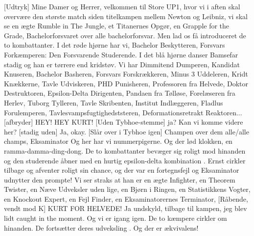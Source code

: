 \documentclass[a4paper,11pt]{article}
\begin{document}
\begin{sketch}
[Udtryk] Mine Damer og Herrer, velkommen til Store UP1, hvor vi i aften skal overvære den største match siden titelkampen mellem Newton og Leibniz, vi skal se en ægte Rumble in The Jungle, et Titanernes Opgør, en Grapple for the Grade, Bachelorforsvaret over alle bachelorforsvar. Men lad os få introduceret de to kombattanter.
I det røde hjørne har vi, Bachelor Beskytteren, Forsvars Forkæmperen: Den Forsvarende Studerende. 
I det blå hjørne danser Bamsefar stadig og han er tørrere end kridstøv. Vi har Dimmitend Dumperen, Kandidat Knuseren, Bachelor Basheren, Forsvars Forskrækkeren, Minus 3 Uddeleren, Kridt Knækkerne, Tavle Udviskeren, PHD Punisheren, Professoren fra Helvede, Doktor Destruktoren, Epsilon-Delta Dirigenten, Pandaen fra Tølløse, Forelæseren fra Herlev, Tuborg Tylleren, Tavle Skribenten, Institut Indlæggeren, Fladlus Forulemperen, Tavlesvampsfugtighedststeren, Deformationsretrakt Reaktoren...
[afbryder] HEY! HEY KURT! 
[Uden Tybhoe-stemme] ja?
 Kan vi komme videre her?
[stadig uden] Ja, okay. 
[Slår over i Tybhoe igen] Champen over dem alle/alle champs, Eksaminator
Og her har vi nummerpigerne.
Og der lød klokken, en ramma-damma-ding-dong. De to kombattanter bevæger sig roligt mod hinanden og den studerende åbner med en hurtig epsilon-delta kombination . Ernst cirkler tilbage og afventer roligt sin chance, og der var en fortegnsfejl  og Eksaminator udnytter den prompte!  Vi ser straks at han er en ægte Infighter, en Theorem Twister, en Næve Udveksler uden lige, en Bjørn i Ringen,  en Statistikkens Vogter, en Knockout Expert, en Fejl Finder, en Eksaminatorernes Terminator,
[Råbende, vendt mod K] KURT FOR HELVEDE!
 Ja undskyld, tilbage til kampen, jeg blev lidt caught in the moment. %
Og vi er igang igen. De to kæmpere cirkler om hinanden.  De fortsætter deres udveksling . Og der er ækvivalens!  \\

\end{sketch}
\end{document}

